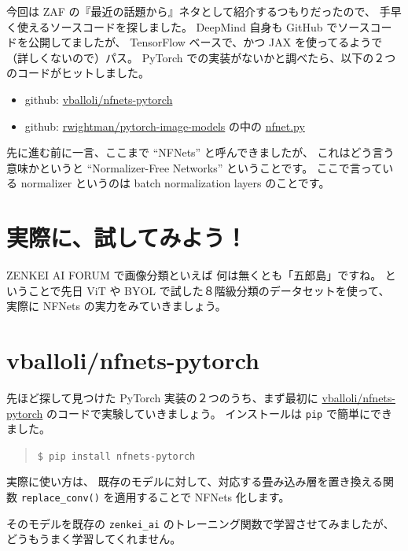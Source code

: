 \documentclass[dvipdfmx,autodetect-engine,10pt,b5paper,papersize,openany,dvipsnames]{jsbook}
\begin{document}
\begin{multicols}{2}
今回は ZAF の『最近の話題から』ネタとして紹介するつもりだったので、
手早く使えるソースコードを探しました。
DeepMind 自身も GitHub でソースコードを公開してましたが、
TensorFlow ベースで、かつ JAX を使ってるようで
（詳しくないので）パス。
PyTorch での実装がないかと調べたら、以下の２つのコードがヒットしました。
\begin{itemize}
\item github: \href{https://github.com/vballoli/nfnets-pytorch}{vballoli/nfnets-pytorch}
\item github: \href{https://github.com/rwightman/pytorch-image-models}{rwightman/pytorch-image-models}
  の中の \href{https://github.com/rwightman/pytorch-image-models/blob/master/timm/models/nfnet.py}{nfnet.py}
\end{itemize}

先に進む前に一言、ここまで ``NFNets'' と呼んできましたが、
これはどう言う意味かというと ``Normalizer-Free Networks'' ということです。
ここで言っている normalizer というのは batch normalization layers のことです。


\section{実際に、試してみよう！}
ZENKEI AI FORUM で画像分類といえば
何は無くとも「五郎島」ですね。
ということで先日 ViT や BYOL で試した８階級分類のデータセットを使って、
実際に NFNets の実力をみていきましょう。


\section{vballoli/nfnets-pytorch}
先ほど探して見つけた PyTorch 実装の２つのうち、まず最初に
\href{https://github.com/vballoli/nfnets-pytorch}{vballoli/nfnets-pytorch}
のコードで実験していきましょう。
インストールは \texttt{pip} で簡単にできました。
\begin{quote}
  \texttt{\$ pip install nfnets-pytorch}
\end{quote}
実際に使い方は、
既存のモデルに対して、対応する畳み込み層を置き換える関数
\texttt{replace\_conv()} を適用することで NFNets 化します。

そのモデルを既存の \texttt{zenkei\_ai} のトレーニング関数で学習させてみましたが、
どうもうまく学習してくれません。



\end{multicols}
\end{document}
